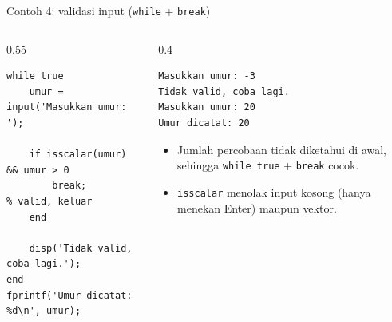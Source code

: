 \documentclass[aspectratio=169,10pt]{beamer}
\newcommand{\kode}[1]{\texttt{#1}}
\begin{document}
\begin{frame}[fragile]{Contoh 4: validasi input \hfill\small(\kode{while} + \kode{break})}
  \begin{columns}[T]
    \begin{column}{0.55\textwidth}
\begin{lstlisting}
while true
    umur = input('Masukkan umur: ');

    if isscalar(umur) && umur > 0
        break;          % valid, keluar
    end

    disp('Tidak valid, coba lagi.');
end
fprintf('Umur dicatat: %d\n', umur);
\end{lstlisting}
    \end{column}
    \begin{column}{0.4\textwidth}
\begin{lstlisting}[style=out]
Masukkan umur: -3
Tidak valid, coba lagi.
Masukkan umur: 20
Umur dicatat: 20
\end{lstlisting}
      \vspace{4pt}
      \footnotesize
      \begin{itemize}
        \item Jumlah percobaan tidak diketahui di awal, sehingga \kode{while true} + \kode{break} cocok.
        \item \kode{isscalar} menolak input kosong (hanya menekan Enter) maupun vektor.
      \end{itemize}
    \end{column}
  \end{columns}
\end{frame}
\end{document}

